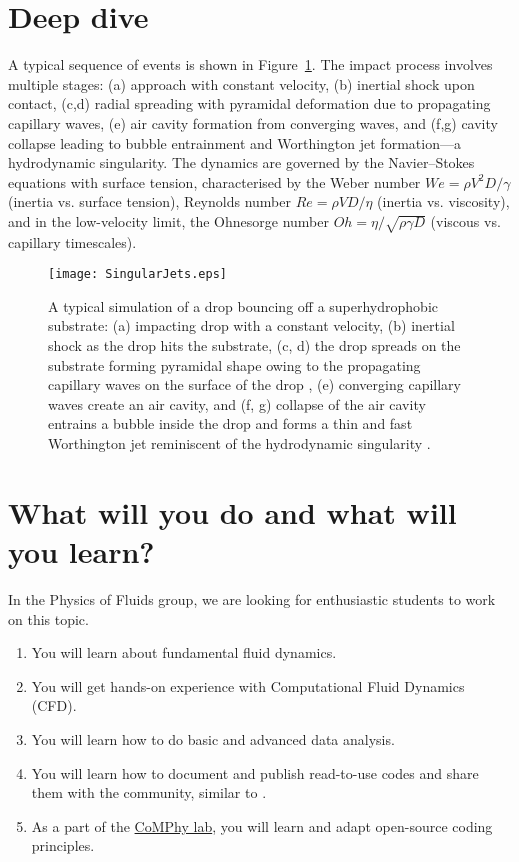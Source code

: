 \documentclass[a4paper,10pt]{article}
\begin{document}
\section*{Deep dive}

A typical sequence of events is shown in Figure~\ref{Figure::Typical}. The impact process involves multiple stages: (a) approach with constant velocity, (b) inertial shock upon contact, (c,d) radial spreading with pyramidal deformation due to propagating capillary waves, (e) air cavity formation from converging waves, and (f,g) cavity collapse leading to bubble entrainment and Worthington jet formation—a hydrodynamic singularity. The dynamics are governed by the Navier–Stokes equations with surface tension, characterised by the Weber number $We = \rho V^2D/\gamma$ (inertia vs. surface tension), Reynolds number $Re = \rho VD/\eta$ (inertia vs. viscosity), and in the low-velocity limit, the Ohnesorge number $Oh = \eta/\sqrt{\rho\gamma D}$ (viscous vs. capillary timescales).

\begin{figure}
\begin{center}
 \texttt{[image: SingularJets.eps]}
 \caption{A typical simulation of a drop bouncing off a superhydrophobic substrate: (a) impacting drop with a constant velocity, (b) inertial shock as the drop hits the substrate, (c, d) the drop spreads on the substrate forming pyramidal shape owing to the propagating capillary waves on the surface of the drop \citep{renardy2003pyramidal, zhang2022impact}, (e) converging capillary waves create an air cavity, and (f, g) collapse of the air cavity entrains a bubble inside the drop and forms a thin and fast Worthington jet reminiscent of the hydrodynamic singularity \citep{Bartolo2006Singular}.}
 \label{Figure::Typical}
\end{center}

\end{figure}
\section*{What will you do and what will you learn?}
In the Physics of Fluids group, we are looking for enthusiastic students to work on this topic.
\begin{enumerate}
\itemsep0em
\item You will learn about fundamental fluid dynamics.
\item You will get hands-on experience with Computational Fluid Dynamics (CFD).
\item You will learn how to do basic and advanced data analysis.
\item You will learn how to document and publish read-to-use codes and share them with the community, similar to \citet{basiliskVatsal, basiliskVatsalDropFilm, basiliskVatsalViscousBouncing}. 
\item As a part of the \href{https://comphy-lab.org}{CoMPhy lab}, you will learn and adapt open-source coding principles. 
\end{enumerate}
\end{document}
